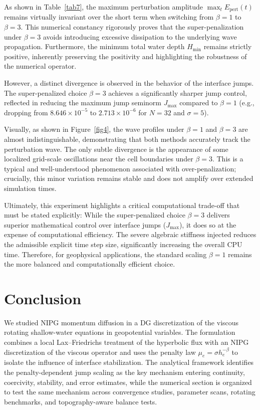 \documentclass[pdflatex,sn-mathphys-num]{sn-jnl}%
\theoremstyle{thmstyleone}%
\theoremstyle{thmstyletwo}%
\theoremstyle{thmstylethree}%
\begin{document}
As shown in Table~\ref{tab7}, the maximum perturbation amplitude $\max_t E_{\text{pert}}(t)$ remains virtually invariant over the short term when switching from $\beta=1$ to $\beta=3$. This numerical constancy rigorously proves that the super-penalization under $\beta=3$ avoids introducing excessive dissipation to the underlying wave propagation. Furthermore, the minimum total water depth $H_{\min}$ remains strictly positive, inherently preserving the positivity and highlighting the  robustness of the numerical operator.

However, a distinct divergence is observed in the behavior of the interface jumps. The super-penalized choice $\beta=3$ achieves a significantly sharper jump control, reflected in reducing the maximum jump seminorm $J_{\max}$ compared to $\beta=1$ (e.g., dropping from $8.646 \times 10^{-5}$ to $2.713 \times 10^{-6}$ for $N=32$ and $\sigma=5$). 

Visually, as shown in Figure~\ref{fig4}, the wave profiles under $\beta=1$ and $\beta=3$ are almost indistinguishable, demonstrating that both methods accurately track the perturbation wave. The only subtle divergence is the appearance of some localized grid-scale oscillations near the cell boundaries under $\beta=3$. This is a typical and well-understood phenomenon associated with over-penalization; crucially, this minor variation remains stable and does not amplify over extended simulation times.

Ultimately, this experiment highlights a critical computational trade-off that must be stated explicitly: While the super-penalized choice $\beta=3$ delivers superior mathematical control over interface jumps ($J_{\max}$), it does so at the expense of computational efficiency. The severe algebraic stiffness injected reduces the admissible explicit time step size, significantly increasing the overall CPU time. Therefore, for geophysical applications, the standard scaling $\beta=1$ remains the more balanced and computationally efficient choice.


\section{Conclusion}
\label{sec:conclusion}

We studied NIPG momentum diffusion in a DG discretization of the viscous rotating shallow-water equations in geopotential variables. The formulation combines a local Lax--Friedrichs treatment of the hyperbolic flux with an NIPG discretization of the viscous operator and uses the penalty law $\mu_e=\sigma h_e^{-\beta}$ to isolate the influence of interface stabilization. The analytical framework identifies the penalty-dependent jump scaling as the key mechanism entering continuity, coercivity, stability, and error estimates, while the numerical section is organized to test the same mechanism across convergence studies, parameter scans, rotating benchmarks, and topography-aware balance tests.
\end{document}
